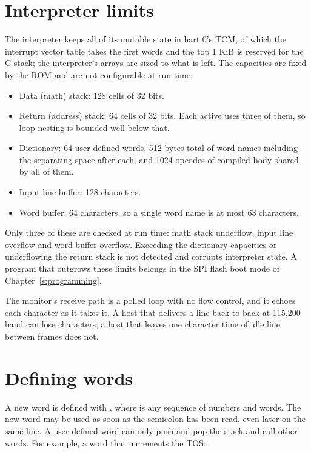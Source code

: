 \documentclass[11pt,pdftex,openany,letterpaper]{report}
\begin{document}


\section{Interpreter limits} \label{ss:forthlimits}

The interpreter keeps all of its mutable state in hart 0's TCM, of which the interrupt vector table takes the first \VectorsCount{} words and the top 1 KiB is reserved for the C stack; the interpreter's arrays are sized to what is left. The capacities are fixed by the ROM and are not configurable at run time:

\begin{itemize}[itemsep=1pt]
	\item Data (math) stack: 128 cells of 32 bits.
	\item Return (address) stack: 64 cells of 32 bits. Each active  uses three of them, so loop nesting is bounded well below that.
	\item Dictionary: 64 user-defined words, 512 bytes total of word names including the separating space after each, and 1024 opcodes of compiled body shared by all of them.
	\item Input line buffer: 128 characters.
	\item Word buffer: 64 characters, so a single word name is at most 63 characters.
\end{itemize}

Only three of these are checked at run time: math stack underflow, input line overflow and word buffer overflow. Exceeding the dictionary capacities or underflowing the return stack is not detected and corrupts interpreter state. A program that outgrows these limits belongs in the SPI flash boot mode of Chapter~\ref{s:programming}.

\begin{Caution}
The monitor's receive path is a polled loop with no flow control, and it echoes each character as it takes it. A host that delivers a line back to back at 115,200 baud can lose characters; a host that leaves one character time of idle line between frames does not.
\end{Caution}

\section{Defining words}

A new word is defined with , where  is any sequence of numbers and words. The new word may be used as soon as the semicolon has been read, even later on the same line. A user-defined word can only push and pop the stack and call other words. For example, a word that increments the TOS:
\end{document}
